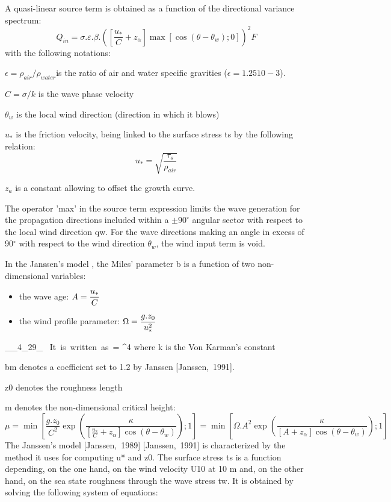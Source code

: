  A quasi-linear source term is obtained as a function of the directional variance spectrum:
\begin{equation} \label{GrindEQ__4_27_}
Q_{in} =\sigma .\varepsilon .\beta .\left(\left[\frac{u_{*} }{C} +z_{\alpha } \right]\max \left[\cos (\theta -\theta _{w} );0\right]\right)^{2} F
\end{equation}
with the following notations:

$ \epsilon = \rho_{air}/\rho_{water }$is the ratio of air and water specific gravities ($ \epsilon = 1.25 10-3$).

 $C = \sigma/k$ is the wave phase velocity

 $\theta_w$ is the local wind direction (direction in which it blows)

 $u_*$ is the friction velocity, being linked to the surface stress ts by the following relation:
\begin{equation} \label{GrindEQ__4_28_}
u_{*} =\sqrt{\frac{\tau _{s} }{\rho _{air} } }
\end{equation}

 $z_a$ is a constant allowing to offset the growth curve.

 The operator 'max' in the source term expression limits the wave generation for the propagation directions included within a $\pm 90^\circ$ angular sector with respect to the local wind direction qw. For the wave directions making an angle in excess of 90${}^\circ$ with respect to the wind direction $\theta_w$, the wind input term is void.

 In the Janssen's model \cite{Janssen1991}, the Miles' parameter b is a function of two non-dimensional variables:

\begin{itemize}
\item  the wave age:  $\displaystyle A=\frac{u_{*} }{C} $
\item  the wind profile parameter: $\displaystyle \Omega =\frac{g.z_{0} }{u_{*}^{2} } $
\end{itemize}
\bequ
{}__4_29_{}
\mbox{ It is written as }\beta = \mu \ln ^{4} \mu 
\eequ
 where k is the Von Karman's constant

 bm denotes a coefficient set to 1.2 by Janssen [Janssen,~1991].

 z0 denotes the roughness length

 m denotes the non-dimensional critical height:
\begin{equation} \label{GrindEQ__4_30_}
\mu =\min \left[\frac{g.z_{0} }{C^{2} } \exp \left(\frac{\kappa }{\left[\frac{u_{*} }{C} +z_{\alpha } \right]\cos (\theta -\theta _{w} )} \right);1\right]=\min \left[\Omega .A^{2} \exp \left(\frac{\kappa }{\left[A+z_{\alpha } \right]\cos (\theta -\theta _{w} )} \right);1\right]
\end{equation}
The Janssen's model [Janssen,~1989] [Janssen,~1991] is characterized by the method it uses for computing u* and z0. The surface stress ts is a function depending, on the one hand, on the wind velocity U10 at 10 m and, on the other hand, on the sea state roughness through the wave stress tw. It is obtained by solving the following system of equations:

